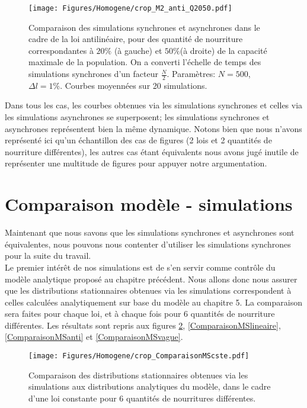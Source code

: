 \begin{figure}[h]
\centering
\texttt{[image: Figures/Homogene/crop\_M2\_anti\_Q2050.pdf]}
\caption{Comparaison des simulations synchrones et asynchrones dans le cadre de la loi antilinéaire, pour des quantité de nourriture correspondantes à $20\%$ (à gauche) et $50\%$(à droite) de la capacité maximale de la population. On a converti l'échelle de temps des simulations synchrones d'un facteur $\frac{N}{2}$. Paramètres: $N=500$, $\Delta l = 1\%$. Courbes moyennées sur 20 simulations.}
\label{EquivalenceAnti}
\end{figure}


Dans tous les cas, les courbes obtenues via les simulations synchrones et celles via les simulations asynchrones se superposent; les simulations synchrones et asynchrones représentent bien la même dynamique. Notons bien que nous n'avons représenté ici qu'un échantillon des cas de figures (2 lois et 2 quantités de nourriture différentes), les autres cas étant équivalents nous avons jugé inutile de représenter une multitude de figures pour appuyer notre argumentation.

\section{Comparaison modèle - simulations}

Maintenant que nous savons que les simulations synchrones et asynchrones sont équivalentes, nous pouvons nous contenter d'utiliser les simulations synchrones pour la suite du travail. \\

Le premier intérêt de nos simulations est de s'en servir comme contrôle du modèle analytique proposé au chapitre précédent. Nous allons donc nous assurer que les distributions stationnaires obtenues via les simulations correspondent à celles calculées analytiquement sur base du modèle au chapitre 5. La comparaison sera faites pour chaque loi, et à chaque fois pour 6 quantités de nourriture différentes. Les résultats sont repris aux figures \ref{ComparaisonMScste}, \ref{ComparaisonMSlineaire}, \ref{ComparaisonMSanti} et \ref{ComparaisonMSvague}.

\begin{figure}[h]
\centering
\texttt{[image: Figures/Homogene/crop\_ComparaisonMScste.pdf]}
\caption{Comparaison des distributions stationnaires obtenues via les simulations aux distributions analytiques du modèle, dans le cadre d'une loi constante pour 6 quantités de nourritures différentes.}
\label{ComparaisonMScste}
\end{figure}

